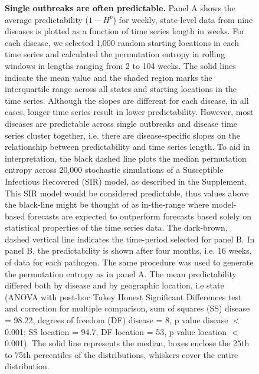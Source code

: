 \documentclass[fleqn,12pt]{wlscirep}
\begin{document}
\begin{figure}[H]
	\centering
	\caption{\label{fig:smallrambo}\textbf{Single outbreaks are often predictable.} Panel A shows the average predictability ($1 - H^p$) for weekly, state-level data from nine diseases is plotted as a function of time series length in weeks.  For each disease, we selected 1,000 random starting locations in each time series and calculated the permutation entropy in rolling windows in lengths ranging from 2 to 104 weeks.  The solid lines indicate the mean value and the shaded region marks the interquartile range across all states and starting locations in the time series.  Although the slopes are different for each disease, in all cases, longer time series result in lower predictability.  However, most diseases are predictable across single outbreaks and disease time series cluster together, i.e. there are disease-specific slopes on the relationship between predictability and time series length.  To aid in interpretation, the black dashed line plots the median permutation entropy across 20,000 stochastic simulations of a Susceptible Infectious Recovered (SIR) model, as described in the Supplement.  This SIR model would be considered predictable, thus values above the black-line might be thought of as in-the-range where model-based forecasts are expected to outperform forecasts based solely on statistical properties of the time series data. The dark-brown, dashed vertical line indicates the time-period selected for panel B. In panel B, the predictability is shown after four months, i.e. 16 weeks, of data for each pathogen. The same procedure was used to generate the permutation entropy as in panel A. The mean predictability differed both by disease and by geographic location, i.e state (ANOVA with post-hoc Tukey Honest Significant Differences test and correction for multiple comparison, sum of squares (SS) disease = 98.22, degrees of freedom (DF) disease = 8, p value disease $<$ 0.001; SS location = 94.7, DF location = 53, p value location  $<$ 0.001). The solid line represents the median, boxes enclose the 25th to 75th percentiles of the distributions, whiskers cover the entire distribution.}
\end{figure}
\end{document}
